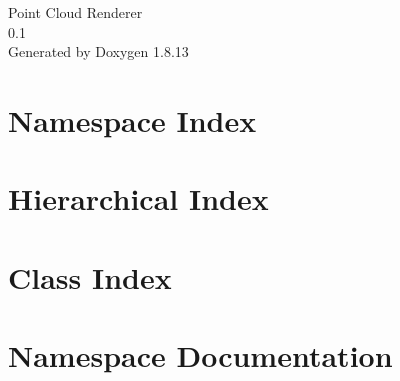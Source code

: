 \documentclass[twoside]{book}
\newcommand{\+}{\discretionary{\mbox{\scriptsize$\hookleftarrow$}}{}{}}
\newcommand{\clearemptydoublepage}{%
  \newpage{\pagestyle{empty}\cleardoublepage}%
}
\begin{document}
\hypersetup{pageanchor=false,
             bookmarksnumbered=true,
             pdfencoding=unicode
            }
\begin{titlepage}
\vspace*{7cm}
\begin{center}%
{\Large Point Cloud Renderer \\[1ex]\large 0.\+1 }\\
\vspace*{1cm}
{\large Generated by Doxygen 1.8.13}\\
\end{center}
\end{titlepage}
\clearemptydoublepage
{}
\tableofcontents
\clearemptydoublepage
{}
\hypersetup{pageanchor=true}

\chapter{Namespace Index}

\chapter{Hierarchical Index}

\chapter{Class Index}

\chapter{Namespace Documentation}





\end{document}
